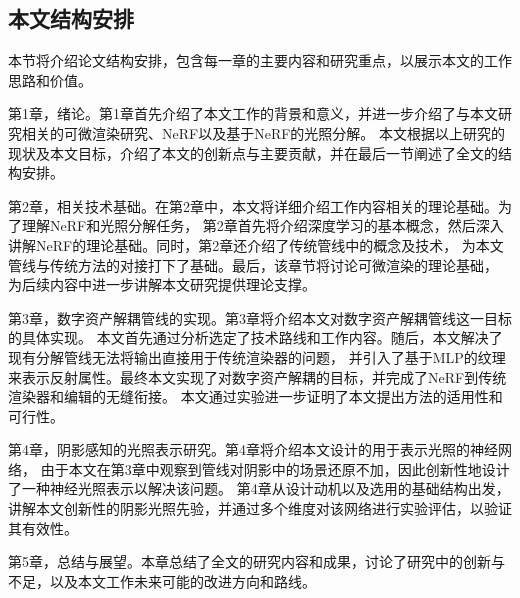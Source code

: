 \subsection{本文结构安排}
本节将介绍论文结构安排，包含每一章的主要内容和研究重点，以展示本文的工作思路和价值。

第1章，绪论。第1章首先介绍了本文工作的背景和意义，并进一步介绍了与本文研究相关的可微渲染研究、NeRF以及基于NeRF的光照分解。
本文根据以上研究的现状及本文目标，介绍了本文的创新点与主要贡献，并在最后一节阐述了全文的结构安排。

第2章，相关技术基础。在第2章中，本文将详细介绍工作内容相关的理论基础。为了理解NeRF和光照分解任务，
第2章首先将介绍深度学习的基本概念，然后深入讲解NeRF的理论基础。同时，第2章还介绍了传统管线中的概念及技术，
为本文管线与传统方法的对接打下了基础。最后，该章节将讨论可微渲染的理论基础，
为后续内容中进一步讲解本文研究提供理论支撑。

第3章，数字资产解耦管线的实现。第3章将介绍本文对数字资产解耦管线这一目标的具体实现。
本文首先通过分析选定了技术路线和工作内容。随后，本文解决了现有分解管线无法将输出直接用于传统渲染器的问题，
并引入了基于MLP的纹理来表示反射属性。最终本文实现了对数字资产解耦的目标，并完成了NeRF到传统渲染器和编辑的无缝衔接。
本文通过实验进一步证明了本文提出方法的适用性和可行性。

第4章，阴影感知的光照表示研究。第4章将介绍本文设计的用于表示光照的神经网络，
由于本文在第3章中观察到管线对阴影中的场景还原不加，因此创新性地设计了一种神经光照表示以解决该问题。
第4章从设计动机以及选用的基础结构出发，讲解本文创新性的阴影光照先验，并通过多个维度对该网络进行实验评估，以验证其有效性。

第5章，总结与展望。本章总结了全文的研究内容和成果，讨论了研究中的创新与不足，以及本文工作未来可能的改进方向和路线。

